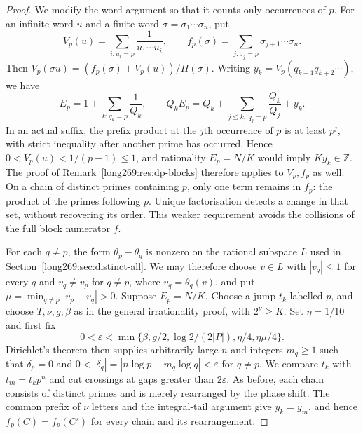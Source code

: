 \begin{proof}
We modify the word argument so that it counts only occurrences of $p$.
For an infinite word $u$ and a finite word $\sigma=\sigma_1\cdots\sigma_n$,
put
\[
 V_p(u)=\sum_{i:u_i=p}\frac1{u_1\cdots u_i},\qquad
 f_p(\sigma)=\sum_{j:\sigma_j=p}\sigma_{j+1}\cdots\sigma_n.
\]
Then $V_p(\sigma u)=(f_p(\sigma)+V_p(u))/\Pi(\sigma)$. Writing
$y_k=V_p(q_{k+1}q_{k+2}\cdots)$, we have
\[
 E_p=1+\sum_{k:q_k=p}\frac1{Q_k},\qquad
 Q_kE_p=Q_k+\sum_{j\le k,\ q_j=p}\frac{Q_k}{Q_j}+y_k.
\]
In an actual suffix, the prefix product at the $j$th occurrence of $p$
is at least $p^j$, with strict inequality after another prime has
occurred. Hence $0<V_p(u)<1/(p-1)\le1$, and rationality $E_p=N/K$
would imply $Ky_k\in\mathbb Z$. The proof of
Remark~\ref{long269:res:dp-blocks} therefore applies to $V_p,f_p$ as well.
On a chain of distinct primes containing $p$, only one term remains in
$f_p$: the product of the primes following $p$. Unique factorisation
detects a change in that set, without recovering its order. This weaker
requirement avoids the collisions of the full block numerator $f$.

For each $q\ne p$, the form $\theta_p-\theta_q$ is nonzero on the
rational subspace $L$ used in Section~\ref{long269:sec:distinct-all}.
We may therefore choose $v\in L$ with $|v_q|\le1$ for every $q$ and
$v_q\ne v_p$ for $q\ne p$, where $v_q=\theta_q(v)$, and put
$\mu=\min_{q\ne p}|v_p-v_q|>0$. Suppose $E_p=N/K$. Choose a jump
$t_k$ labelled $p$, and choose $T,\nu,g,\beta$ as in the general
irrationality proof, with $2^\nu\ge K$. Set $\eta=1/10$ and first fix
\[
 0<\varepsilon<\min\{\beta,g/2,\log2/(2|P|),\eta/4,\eta\mu/4\}.
\]
Dirichlet's theorem then supplies arbitrarily large $n$ and integers
$m_q\ge1$ such that $\delta_p=0$ and
$0<|\delta_q|=|n\log p-m_q\log q|<\varepsilon$ for $q\ne p$.
We compare $t_k$ with $t_m=t_kp^n$ and cut crossings at gaps greater than
$2\varepsilon$. As before, each chain consists of distinct primes and
is merely rearranged by the phase shift. The common prefix of $\nu$
letters and the integral-tail argument give $y_k=y_m$, and hence
$f_p(C)=f_p(C')$ for every chain and its rearrangement.


\end{proof}
